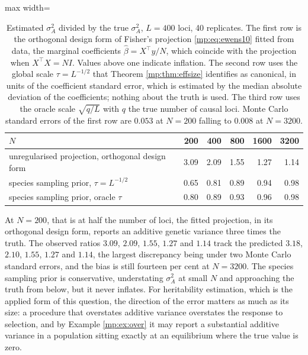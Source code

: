 \begin{table}[t]
\centering
\begin{adjustbox}{max width=\textwidth}
\begin{tabular}{lrrrrr}
\toprule
$N$ & 200 & 400 & 800 & 1600 & 3200 \\
\midrule
unregularised projection, orthogonal design form & 3.09 & 2.09 & 1.55 & 1.27 & 1.14 \\
species sampling prior, $\tau=L^{-1/2}$ & 0.65 & 0.81 & 0.89 & 0.94 & 0.98 \\
species sampling prior, oracle $\tau$ & 0.80 & 0.89 & 0.93 & 0.96 & 0.98 \\
\bottomrule
\end{tabular}
\end{adjustbox}
\caption{Estimated $\sigma_A^2$ divided by the true $\sigma_A^2$, $L=400$ loci, 40
replicates. The first row is the orthogonal design form of Fisher's projection \eqref{mp:eq:ewens10} fitted from data, the marginal coefficients $\hat\beta=X^\top y/N$, which coincide with the projection when $X^\top X=NI$. Values
above one indicate inflation. The second row uses the global scale $\tau=L^{-1/2}$ that
Theorem \ref{mp:thm:effsize} identifies as canonical, in units of the coefficient standard
error, which is estimated by the median absolute deviation of the coefficients; nothing
about the truth is used. The third row uses the oracle scale $\sqrt{q/L}$ with $q$ the true
number of causal loci. Monte Carlo standard errors of the first row are $0.053$ at $N=200$
falling to $0.008$ at $N=3200$.}
\label{mp:tab:sigmaA}
\end{table}

At $N=200$, that is at half the number of loci, the fitted projection, in its orthogonal design form, reports an additive
genetic variance three times the truth. The observed ratios $3.09$, $2.09$, $1.55$, $1.27$
and $1.14$ track the predicted $3.18$, $2.10$, $1.55$, $1.27$ and $1.14$, the largest
discrepancy being under two Monte Carlo standard errors, and the bias is still fourteen per
cent at $N=3200$. The species
sampling prior is conservative, understating $\sigma_A^2$ at small $N$ and approaching the
truth from below, but it never inflates. For heritability estimation, which is the applied
form of this question, the direction of the error matters as much as its size: a procedure
that overstates additive variance overstates the response to selection, and by Example
\ref{mp:ex:over} it may report a substantial additive variance in a population sitting exactly
at an equilibrium where the true value is zero.

